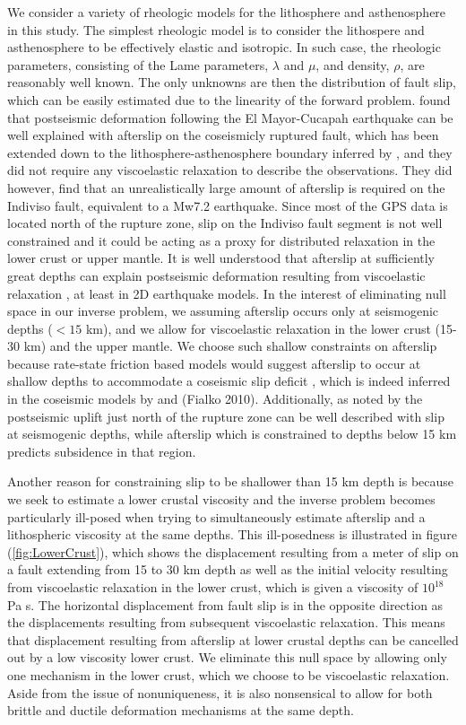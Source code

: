 \documentclass[12pt]{article}
\begin{document}
We consider a variety of rheologic models for the lithosphere and asthenosphere in this study.  The simplest rheologic model is to consider the lithospere and asthenosphere to be effectively elastic and isotropic.  In such case, the rheologic parameters, consisting of the Lame parameters, $\lambda$ and $\mu$, and density, $\rho$, are reasonably well known. The only unknowns are then the distribution of fault slip, which can be easily estimated due to the linearity of the forward problem.  \cite{Rollins2015} found that postseismic deformation following the El Mayor-Cucapah earthquake can be well explained with afterslip on the coseismicly ruptured fault, which has been extended down to the lithosphere-asthenosphere boundary inferred by \cite{Lekic2011}, and they did not require any viscoelastic relaxation to describe the observations.  They did however, find that an unrealistically large amount of afterslip is required on the Indiviso fault, equivalent to a Mw7.2 earthquake.  Since most of the GPS data is located north of the rupture zone, slip on the Indiviso fault segment is not well constrained and it could be acting as a proxy for distributed relaxation in the lower crust or upper mantle.  It is well understood that afterslip at sufficiently great depths can explain postseismic deformation resulting from viscoelastic relaxation \cite{Savage1990}, at least in 2D earthquake models.  In the interest of eliminating null space in our inverse problem,  we assuming afterslip occurs only at seismogenic depths ($<15$ km), and we allow for viscoelastic relaxation in the lower crust (15-30 km) and the upper mantle.  We choose such shallow constraints on afterslip because rate-state friction based models would suggest afterslip to occur at shallow depths to accommodate a coseismic slip deficit \cite{Marone1991}, which is indeed inferred in the coseismic models by \cite{Wei2011a} and (Fialko 2010).  Additionally, as noted by \cite{Rollins2015} the postseismic uplift just north of the rupture zone can be well described with slip at seismogenic depths, while afterslip which is constrained to depths below 15 km predicts subsidence in that region.  

Another reason for constraining slip to be shallower than 15 km depth is because we seek to estimate a lower crustal viscosity and the inverse problem becomes particularly ill-posed when trying to simultaneously estimate afterslip and a lithospheric viscosity at the same depths. 
This ill-posedness is illustrated in figure (\ref{fig:LowerCrust}), which shows the displacement resulting from a meter of slip on a fault extending from 15 to 30 km depth as well as the initial velocity resulting from viscoelastic relaxation in the lower crust, which is given a viscosity of $10^{18}$ Pa s.  The horizontal displacement from fault slip is in the opposite direction as the displacements resulting from subsequent viscoelastic relaxation.  This means that displacement resulting from afterslip at lower crustal depths can be cancelled out by a low viscosity lower crust.  We eliminate this null space by allowing only one mechanism in the lower crust, which we choose to be viscoelastic relaxation.  Aside from the issue of nonuniqueness, it is also nonsensical to allow for both brittle and ductile deformation mechanisms at the same depth. 
\end{document}
